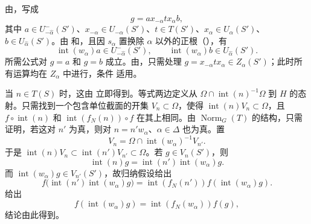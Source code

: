 
由，写成
\[
  g=ax_{-\alpha}tx_\alpha b,
\]
其中 \(a\in U^-_{-\widehat\alpha}(S')\)、\(x_{-\alpha}\in U_{-\alpha}(S')\)、\(t\in T(S')\)、\(x_\alpha\in U_\alpha(S')\)、\(b\in U_{\widehat\alpha}(S')\)。由 和，且因 \(s_\alpha\) 置换除 \(\alpha\) 以外的正根（），有
\[
  \operatorname{int}(w_\alpha)a\in U^-_{-\widehat\alpha}(S'),
  \qquad
  \operatorname{int}(w_\alpha)b\in U_{\widehat\alpha}(S').
\]
所需公式对 \(g=a\) 和 \(g=b\) 成立。由，只需处理 \(g=x_{-\alpha}tx_\alpha\in Z_\alpha(S')\)；此时所有运算均在 \(Z_\alpha\) 中进行，条件 适用。


当 \(n\in T(S)\) 时，这由 立即得到。等式两边定义从 \(\Omega\cap\operatorname{int}(n)^{-1}\Omega\) 到 \(H\) 的态射。只需找到一个包含单位截面的开集 \(V_n\subset\Omega\)，使得 \(\operatorname{int}(n)V_n\subset\Omega\)，且 \(f\circ\operatorname{int}(n)\) 和 \(\operatorname{int}(f_N(n))\circ f\) 在其上相同。由 \(\operatorname{Norm}_G(T)\) 的结构，只需证明，若这对 \(n'\) 为真，则对 \(n=n'w_\alpha\)、\(\alpha\in\Delta\) 也为真。置
\[
  V_n=\Omega\cap\operatorname{int}(w_\alpha)^{-1}V_{n'}.
\]
于是 \(\operatorname{int}(n)V_n\subset\operatorname{int}(n')V_{n'}
\subset\Omega\)。若 \(g\in V_n(S')\)，则
\[
  \operatorname{int}(n)g
   =\operatorname{int}(n')\operatorname{int}(w_\alpha)g.
\]
而 \(\operatorname{int}(w_\alpha)g\in V_{n'}(S')\)，故归纳假设给出
\[
  f\bigl(\operatorname{int}(n')\operatorname{int}(w_\alpha)g\bigr)
   =\operatorname{int}(f_N(n'))f(\operatorname{int}(w_\alpha)g).
\]
 给出
\[
  f(\operatorname{int}(w_\alpha)g)
   =\operatorname{int}(f_N(w_\alpha))f(g),
\]
结论由此得到。

